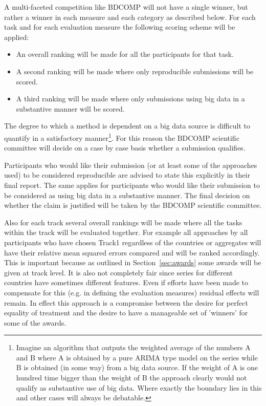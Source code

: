 \documentclass[12pt]{article}
\begin{document}
A multi-faceted competition like BDCOMP will not have a single winner, but rather a winner in each measure and each category as described below. For each task and for each evaluation measure the following scoring scheme will be applied:
\begin{itemize}
    \item{An overall ranking will be made for all the participants for that task.}
    \item{A second ranking will be made where only reproducible submissions will be scored.}
    \item{A third ranking will be made where only submissions using big data in a substantive manner will be scored.}
\end{itemize}

The degree to which a method is dependent on a big data source is difficult to quantify in a satisfactory manner\footnote{Imagine an algorithm that outputs the weighted average of the numbers A and B where A is obtained by a pure ARIMA type model on the series while B is obtained (in some way) from a big data source. If the weight of A is one hundred time bigger than the weight of B the approach clearly would not qualify as substantive use of big data. Where exactly the boundary lies in this and other cases will always be debatable.}.  For this reason the BDCOMP scientific committee will decide on a case by case basis whether a submission qualifies.

Participants who would like their submission (or at least some of the approaches used) to be considered reproducible are advised to state this explicitly in their final report. The same applies for participants who would like their submission to be considered as using big data in a substantive manner. The final decision on whether the claim is justified will be taken by the BDCOMP scientific committee.

Also for each track several overall rankings will be made where all the tasks within the track will be evaluated together. For example all approaches by all participants who have chosen Track1 regardless of the countries or aggregates will have their relative mean squared errors compared and will be ranked accordingly. This is important because as outlined in Section~\ref{sec:awards} some awards will be given at track level. It is also not completely fair since series for different countries have sometimes different features. Even if efforts have been made to compensate for this (e.g. in defining the evaluation measures) residual effects will remain. In effect this approach is a compromise between the desire for perfect equality of treatment and the desire to have a manageable set of 'winners' for some of the awards.  
\end{document}
